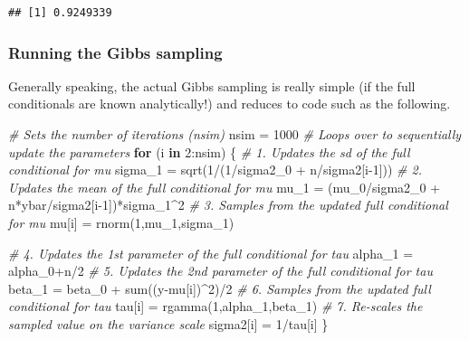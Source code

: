 \documentclass[
]{article}
\newenvironment{Shaded}{\begin{snugshade}}{\end{snugshade}}
\newcommand{\CommentTok}[1]{\textcolor[rgb]{0.56,0.35,0.01}{\textit{#1}}}
\newcommand{\ControlFlowTok}[1]{\textcolor[rgb]{0.13,0.29,0.53}{\textbf{#1}}}
\newcommand{\DecValTok}[1]{\textcolor[rgb]{0.00,0.00,0.81}{#1}}
\newcommand{\FunctionTok}[1]{\textcolor[rgb]{0.00,0.00,0.00}{#1}}
\newcommand{\NormalTok}[1]{#1}
\newcommand{\OtherTok}[1]{\textcolor[rgb]{0.56,0.35,0.01}{#1}}
\newcommand{\SpecialCharTok}[1]{\textcolor[rgb]{0.00,0.00,0.00}{#1}}
\begin{document}
\begin{verbatim}
## [1] 0.9249339
\end{verbatim}

\hypertarget{running-the-gibbs-sampling}{%
\subsubsection{Running the Gibbs
sampling}\label{running-the-gibbs-sampling}}

Generally speaking, the actual Gibbs sampling is really simple (if the
full conditionals are known analytically!) and reduces to code such as
the following.

\begin{Shaded}
\begin{Highlighting}[]
\CommentTok{\# Sets the number of iterations (nsim)}
\NormalTok{nsim }\OtherTok{=} \DecValTok{1000}
\CommentTok{\# Loops over to sequentially update the parameters}
\ControlFlowTok{for}\NormalTok{ (i }\ControlFlowTok{in} \DecValTok{2}\SpecialCharTok{:}\NormalTok{nsim) \{}
  \CommentTok{\# 1. Updates the sd of the full conditional for mu}
\NormalTok{  sigma\_1 }\OtherTok{=} \FunctionTok{sqrt}\NormalTok{(}\DecValTok{1}\SpecialCharTok{/}\NormalTok{(}\DecValTok{1}\SpecialCharTok{/}\NormalTok{sigma2\_0 }\SpecialCharTok{+}\NormalTok{ n}\SpecialCharTok{/}\NormalTok{sigma2[i}\DecValTok{{-}1}\NormalTok{]))}
  \CommentTok{\# 2. Updates the mean of the full conditional for mu}
\NormalTok{  mu\_1 }\OtherTok{=}\NormalTok{ (mu\_0}\SpecialCharTok{/}\NormalTok{sigma2\_0 }\SpecialCharTok{+}\NormalTok{ n}\SpecialCharTok{*}\NormalTok{ybar}\SpecialCharTok{/}\NormalTok{sigma2[i}\DecValTok{{-}1}\NormalTok{])}\SpecialCharTok{*}\NormalTok{sigma\_1}\SpecialCharTok{\^{}}\DecValTok{2}
  \CommentTok{\# 3. Samples from the updated full conditional for mu}
\NormalTok{  mu[i] }\OtherTok{=} \FunctionTok{rnorm}\NormalTok{(}\DecValTok{1}\NormalTok{,mu\_1,sigma\_1)}
  
  \CommentTok{\# 4. Updates the 1st parameter of the full conditional for tau}
\NormalTok{  alpha\_1 }\OtherTok{=}\NormalTok{ alpha\_0}\SpecialCharTok{+}\NormalTok{n}\SpecialCharTok{/}\DecValTok{2}
  \CommentTok{\# 5. Updates the 2nd parameter of the full conditional for tau}
\NormalTok{  beta\_1 }\OtherTok{=}\NormalTok{ beta\_0 }\SpecialCharTok{+} \FunctionTok{sum}\NormalTok{((y}\SpecialCharTok{{-}}\NormalTok{mu[i])}\SpecialCharTok{\^{}}\DecValTok{2}\NormalTok{)}\SpecialCharTok{/}\DecValTok{2}
  \CommentTok{\# 6. Samples from the updated full conditional for tau}
\NormalTok{  tau[i] }\OtherTok{=} \FunctionTok{rgamma}\NormalTok{(}\DecValTok{1}\NormalTok{,alpha\_1,beta\_1)}
  \CommentTok{\# 7. Re{-}scales the sampled value on the variance scale}
\NormalTok{  sigma2[i] }\OtherTok{=} \DecValTok{1}\SpecialCharTok{/}\NormalTok{tau[i]}
\NormalTok{\}}
\end{Highlighting}
\end{Shaded}
\end{document}
